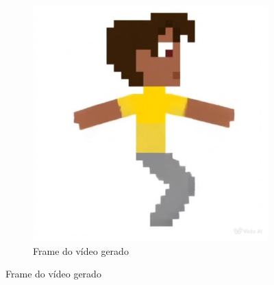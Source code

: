 \begin{figure}[htbp]
    \begin{subfigure}{0.45\linewidth}
        \includegraphics[width=1\linewidth]{figs/vidu/framePuloDobra.jpg}
        \caption{\small Frame do vídeo gerado}
        \label{fig:viduPulo2b}
    \end{subfigure}
\end{figure}

